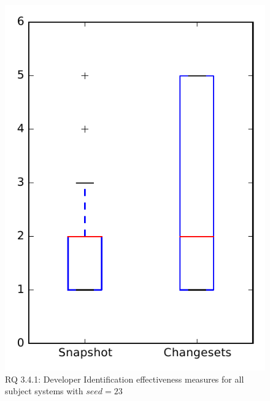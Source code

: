 
\begin{figure}
\centering
\includegraphics[height=0.4\textheight]{figures/dit_seed/rq1_overview_23}
\caption{RQ 3.4.1: Developer Identification effectiveness measures for all subject systems with $seed=23$}
\label{fig:dit_seed:rq1:overview}
\end{figure}
